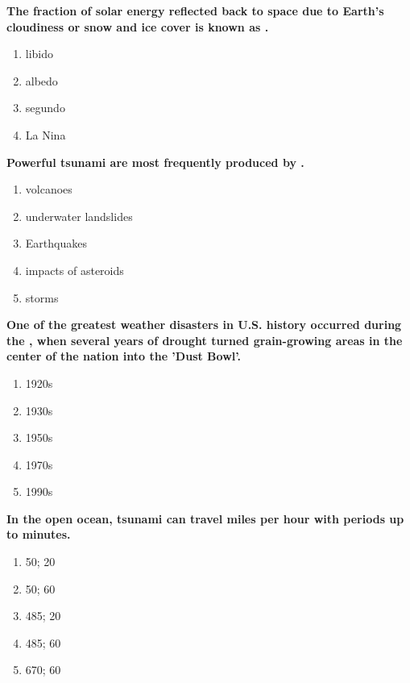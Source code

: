 \item {
\setlength{\itemsep}{0cm}
\setlength{\parskip}{.2cm}
\begin{samepage}
\textbf{
The fraction of solar energy reflected back to space due to Earth's cloudiness or snow and ice cover is known as \makebox[1cm]{\Rivpt\hrulefill\Rivpt}.
}
\begin{enumerate}
\item {  libido }
\item {  albedo }
\item {  segundo }
\item {  La Nina }
\end{enumerate}
\end{samepage}
}
\item {
\setlength{\itemsep}{0cm}
\setlength{\parskip}{.2cm}
\begin{samepage}
\textbf{
Powerful tsunami are most frequently produced by \makebox[1cm]{\Rivpt\hrulefill\Rivpt}.
}
\begin{enumerate}
\item { 	volcanoes }
\item { 	underwater landslides }
\item { 	Earthquakes }
\item { 	impacts of asteroids }
\item { 	storms 		 }
\end{enumerate}
\end{samepage}
}
\item {
\setlength{\itemsep}{0cm}
\setlength{\parskip}{.2cm}
\begin{samepage}
\textbf{
One of the greatest weather disasters in U.S. history occurred during the \makebox[1cm]{\Rivpt\hrulefill\Rivpt}, when several years of drought turned grain-growing areas in the center of the nation into the 'Dust Bowl'. 
}
\begin{enumerate}
\item {  1920s }
\item {  1930s }
\item {  1950s }
\item {  1970s }
\item {  1990s }
\end{enumerate}
\end{samepage}
}
\item {
\setlength{\itemsep}{0cm}
\setlength{\parskip}{.2cm}
\begin{samepage}
\textbf{
In the open ocean, tsunami can travel \makebox[1cm]{\Rivpt\hrulefill\Rivpt} miles per hour with periods up to \makebox[1cm]{\Rivpt\hrulefill\Rivpt} minutes.
}
\begin{enumerate}
\item { 	50; 20 }
\item { 	50; 60 }
\item { 	485; 20 }
\item { 	485; 60 }
\item { 	670; 60 		 }
\end{enumerate}
\end{samepage}
}
